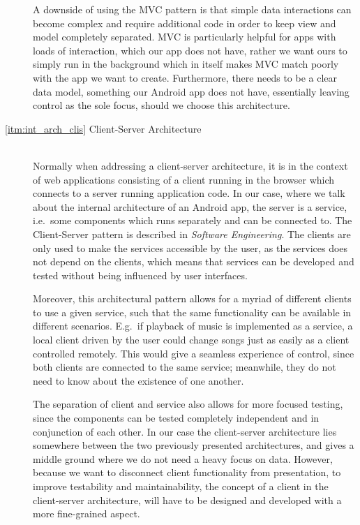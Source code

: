 \begin{description}
A downside of using the MVC pattern is that simple data interactions can become complex and require additional code in order to keep view and model completely separated.
MVC is particularly helpful for apps with loads of interaction, which our app does not have, rather we want ours to simply run in the background which in itself makes MVC match poorly with the app we want to create.
Furthermore, there needs to be a clear data model, something our Android app does not have, essentially leaving control as the sole focus, should we choose this architecture.

\item[\ref{itm:int_arch_clis} Client-Server Architecture]\hfill\\
Normally when addressing a client-server architecture, it is in the context of web applications consisting of a client running in the browser which connects to a server running application code.
In our case, where we talk about the internal architecture of an Android app, the server is a service, i.e.~some components which runs separately and can be connected to.
The Client-Server pattern is described in \textit{Software Engineering}\cite[p.~180-181]{sommerville}.
The clients are only used to make the services accessible by the user, as the services does not depend on the clients, which means that services can be developed and tested without being influenced by user interfaces.

Moreover, this architectural pattern allows for a myriad of different clients to use a given service, such that the same functionality can be available in different scenarios.
E.g.~if playback of music is implemented as a service, a local client driven by the user could change songs just as easily as a client controlled remotely.
This would give a seamless experience of control, since both clients are connected to the same service; meanwhile, they do not need to know about the existence of one another.

The separation of client and service also allows for more focused testing, since the components can be tested completely independent and in conjunction of each other.
In our case the client-server architecture lies somewhere between the two previously presented architectures, and gives a middle ground where we do not need a heavy focus on data.
However, because we want to disconnect client functionality from presentation, to improve testability and maintainability, the concept of a client in the client-server architecture, will have to be designed and developed with a more fine-grained aspect.
\end{description}
